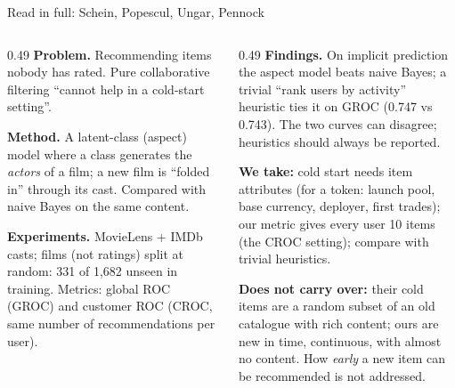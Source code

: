 \documentclass[aspectratio=169,10pt]{beamer}
\newcommand{\toindex}{\hfill\hyperlink{index}{\beamerreturnbutton{index}}}
\begin{document}
\begin{frame}[label=schein]{Read in full: Schein, Popescul, Ungar, Pennock \cite{schein2002} \toindex}
  \footnotesize
  \begin{columns}[T]
    \begin{column}{0.49\textwidth}
      \textbf{Problem.} Recommending items nobody has rated. Pure collaborative filtering ``cannot help in a cold-start setting''.
      \par\medskip
      \textbf{Method.} A latent-class (aspect) model where a class generates the \emph{actors} of a film; a new film is ``folded in'' through its cast. Compared with naive Bayes on the same content.
      \par\medskip
      \textbf{Experiments.} MovieLens + IMDb casts; films (not ratings) split at random: 331 of 1{,}682 unseen in training. Metrics: global ROC (GROC) and customer ROC (CROC, same number of recommendations per user).
    \end{column}
    \begin{column}{0.49\textwidth}
      \textbf{Findings.} On implicit prediction the aspect model beats naive Bayes; a trivial ``rank users by activity'' heuristic ties it on GROC (0.747 vs 0.743). The two curves can disagree; heuristics should always be reported.
      \par\medskip
      {\color{teal}\textbf{We take:}} cold start needs item attributes (for a token: launch pool, base currency, deployer, first trades); our metric gives every user 10 items (the CROC setting); compare with trivial heuristics.
      \par\medskip
      {\color{orange}\textbf{Does not carry over:}} their cold items are a random subset of an old catalogue with rich content; ours are new in time, continuous, with almost no content. How \emph{early} a new item can be recommended is not addressed.
    \end{column}
  \end{columns}
\end{frame}
\end{document}
